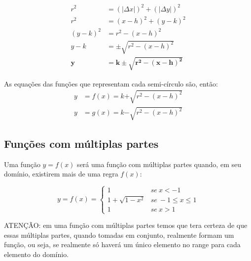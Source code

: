 \documentclass[pdftex, brazil, 12pt, twoside]{article}
\begin{document}
\begin{equation}
  \begin{split}
    r^2 & = (|\Delta x|)^2 + (|\Delta y|)^2\\
    r^2 & = (x - h)^2 + (y - k)^2\\
    (y - k)^2 & = r^2 - (x - h)^2\\
    y - k & = \pm \sqrt{r^2 - (x - h)^2}\\
    \bm{y} & \bm{= k \pm \sqrt{r^2 - (x - h)^2}}
  \end{split}
\end{equation}

As equações das funções que representam cada semi-círculo são, então:
\begin{equation}
  \begin{split}
    y & = f(x) = k \bm{+} \sqrt{r^2 - (x - h)^2}\\
    y & = g(x) = k \bm{-} \sqrt{r^2 - (x - h)^2}
  \end{split}
\end{equation}


\subsection{Funções com múltiplas partes}
\label{analise-grafica-multipart}

Uma função $y=f(x)$ será uma função com múltiplas partes quando, em seu domínio,
existirem mais de uma regra $f(x)$:

\begin{equation}
  y = f(x) =
  \begin{cases} 
      1                & se\ x < -1 \\
      1 + \sqrt{1-x^2} & se\ -1 \leq x \leq 1 \\
      1                & se\ x > 1
  \end{cases}
\end{equation}

ATENÇÃO: em uma função com múltiplas partes temos que tera certeza de que essas
múltiplas partes, quando tomadas em conjunto, realmente formam um função, ou seja,
se realmente só haverá um único elemento no range para cada elemento do domínio.




\end{document}
